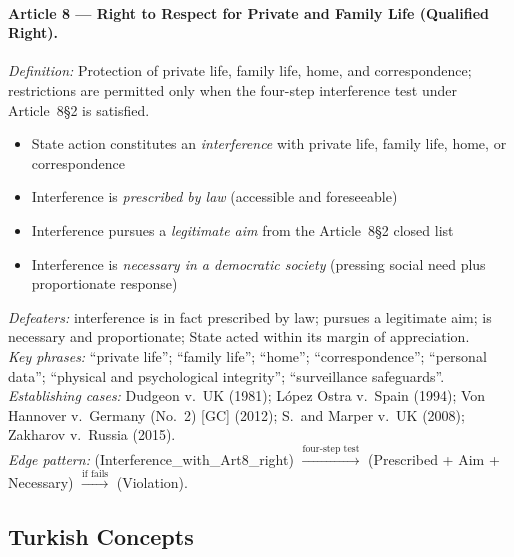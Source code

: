 \documentclass[11pt]{article}
\begin{document}
\paragraph{Article 8 --- Right to Respect for Private and Family Life (Qualified Right).}
\textit{Definition:} Protection of private life, family life, home, and correspondence; restrictions are permitted only when the four-step interference test under Article~8\S2 is satisfied.
\begin{itemize}[nosep,leftmargin=*]
  \item[\textsc{and}] State action constitutes an \emph{interference} with private life, family life, home, or correspondence
  \item[\textsc{and}] Interference is \emph{prescribed by law} (accessible and foreseeable)
  \item[\textsc{and}] Interference pursues a \emph{legitimate aim} from the Article~8\S2 closed list
  \item[\textsc{and}] Interference is \emph{necessary in a democratic society} (pressing social need plus proportionate response)
\end{itemize}
\textit{Defeaters:} interference is in fact prescribed by law; pursues a legitimate aim; is necessary and proportionate; State acted within its margin of appreciation.\\
\textit{Key phrases:} ``private life''; ``family life''; ``home''; ``correspondence''; ``personal data''; ``physical and psychological integrity''; ``surveillance safeguards''.\\
\textit{Establishing cases:} Dudgeon v.\ UK (1981); L\'{o}pez Ostra v.\ Spain (1994); Von Hannover v.\ Germany (No.~2) [GC] (2012); S.\ and Marper v.\ UK (2008); Zakharov v.\ Russia (2015).\\
\textit{Edge pattern:} (Interference\_with\_Art8\_right) $\xrightarrow{\text{four-step test}}$ (Prescribed + Aim + Necessary) $\xrightarrow{\text{if fails}}$ (Violation).

\subsection{Turkish Concepts}
\label{app:ontology:turkish}
\end{document}

